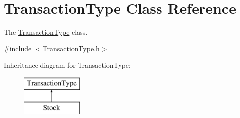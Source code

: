\hypertarget{class_transaction_type}{}\section{Transaction\+Type Class Reference}
\label{class_transaction_type}


The \mbox{\hyperlink{class_transaction_type}{Transaction\+Type}} class.  




{\ttfamily \#include $<$Transaction\+Type.\+h$>$}

Inheritance diagram for Transaction\+Type\+:\begin{figure}[H]
\begin{center}
\leavevmode
\includegraphics[height=2.000000cm]{class_transaction_type}
\end{center}
\end{figure}
